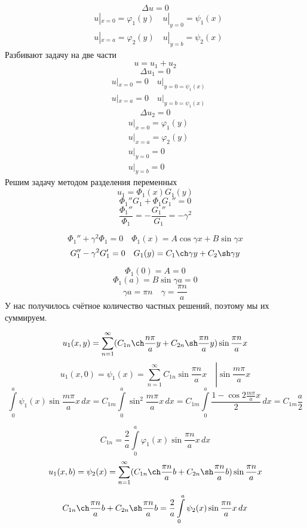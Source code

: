 \[
	\Delta u = 0
\]
\begin{align*}
	&u|_{x = 0} = \varphi_1(y) \quad u|_{y = 0} = \psi_1 (x)\\
	&u|_{x = a} = \varphi_2 (y) \quad u|_{y = b} = \psi_2 (x)
\end{align*}
Разбивают задачу на две части
\[
	u = u_1 + u_2
\]
\[
	\Delta u_1 = 0
\]
\begin{align*}
	&u|_{x = 0} = 0 \quad u|_{y = 0 = \psi_1 (x)}\\
	&u|_{x = a} = 0 \quad u|_{y = b = \psi_1(x)} 
\end{align*}
\[
	\Delta u_2 = 0
\]
\begin{align*}
	&u|_{x =0} = \varphi_1 (y)\\
	&u|_{x =a} = \varphi_2 (y)\\
	&u|_{y =0} = 0\\
	&u|_{y =b} = 0
\end{align*}
Решим задачу методом разделения переменных
\[
	u_1 = \Phi_1 (x) G_1 (y)
\]
\[
	\Phi_1''G_1 + \Phi_1 G_1 '' = 0
\]
\[
	\frac{\Phi_1 ''}{\Phi_1} = - \frac{G_1 ''}{G_1} = - \gamma^2
\]

\[
	\Phi_1'' + \gamma^2 \Phi_1  = 0 \quad \Phi_1(x) = A \cos \gamma x + B \sin \gamma x
\]
\[
	G_1'' - \gamma^2 G_1' = 0 \quad G_1(y) = C_1 \ch \gamma y + C_2 \sh \gamma y
\]

\[
	\Phi_1(0) = A = 0
\]
\[
	\Phi_1 (a) = B \sin \gamma a = 0
\]
\[
	\gamma a = \pi n \quad \gamma = \frac{\pi n}{a}
\]
У нас получилось счётное количество частных решений, поэтому мы их суммируем.

\[
	u_1 (x, y) = \sum\limits_{n = 1}^{\infty} (C_{1n} \ch \frac{n\pi}{a} y + C_{2n} \sh \frac{\pi n}{a}y)  \sin \frac{\pi n}{a}x
\]
\[
	u_1(x, 0) = \psi_1 (x) = \left.\sum\limits_{n = 1}^{\infty} C_{1n} \sin \frac{\pi n}{a} x \quad \right| \sin \frac{m \pi}{a} x
\]
\[
	\int\limits_{0}^{a} \psi_1(x) \sin \frac{m \pi}{a} x\, dx = C_{1m} \int\limits_{0}^{a} \sin^2 \frac{m \pi}{a} x\, dx = C_{1m} \int\limits_{0}^{a} \frac{1 - \cos 2 \frac{m \pi}{a} x}{2}\, dx = C_{1m} \frac{a}{2}
\]

\[
	C_{1n} = \frac{2}{a} \int\limits_{0}^{a} \varphi_1(x) \sin \frac{\pi n}{a} x\, dx
\]
\[
	u_1(x, b) = \psi_2(x) = \sum_{n = 1}^{\infty} (C_{1n} \ch \frac{\pi n}{a} b + C_{2n} \sh \frac{\pi n}{a}b) \sin \frac{\pi n}{a} x
\]

\[
	C_{1n} \ch \frac{\pi n}{a} b + C_{2n} \sh \frac{\pi n}{a}b = \frac{2}{a} \int\limits_{0}^{a} \psi_2 (x) \sin \frac{\pi n}{a} x\, dx
\]\\

